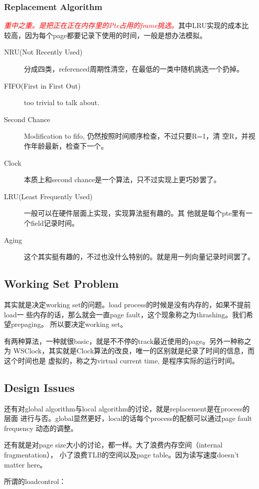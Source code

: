 \documentclass[a4paper]{article}
\newcommand{\emphasis}[1]{\textcolor{red}{\textit{#1}}}
\begin{document}
\subsubsection{Replacement Algorithm}
\emphasis{重中之重。是把正在正在内存里的Pte占用的frame挑选。}其中LRU实现的成本比
较高，因为每个page都要记录下使用的时间，一般是想办法模拟。
\begin{description}
\item[NRU(Not Recently Used)]{分成四类，referenced周期性清空，在最低的一类中随机挑选一个扔掉。} 
\item[FIFO(First in First Out)]{too trivial to talk about.} 
\item[Second Chance]{Modification to fifo, 仍然按照时间顺序检查，不过只要R=1，清
    空R，并视作年龄最新，检查下一个。} 
\item[Clock]{本质上和second chance是一个算法，只不过实现上更巧妙罢了。} 
\item[LRU(Least Frequently Used)]{一般可以在硬件层面上实现，实现算法挺有趣的。其
    他就是每个pte里有一个field记录时间。} 
\item[Aging]{这个其实挺有趣的，不过也没什么特别的。就是用一列向量记录时间罢了。} 
\end{description}

\subsection{Working Set Problem}
其实就是决定working set的问题。load process的时候是没有内存的，如果不提前load一
些内存的话，那么就会一直page fault，这个现象称之为thrashing。我们希望prepaging。
所以要决定working set。

有两种算法，一种就很basic，就是不不停的track最近使用的page。另外一种称之为
WSClock，其实就是Clock算法的改良，唯一的区别就是纪录了时间的信息，而这个时间也是
虚拟的，称之为virtual current time, 是程序实际的运行时间。

\subsection{Design Issues}
还有对global algorithm与local algorithm的讨论，就是replacement是在process的层面
进行与否。global显然更好，local的话每个process的配额可以通过page fault frequency
动态的调整。

还有就是对page size大小的讨论，都一样。大了浪费内存空间（internal fragmentation），
小了浪费TLB的空间以及page table。因为读写速度doesn't matter here。

所谓的loadcontrol：
\end{document}
